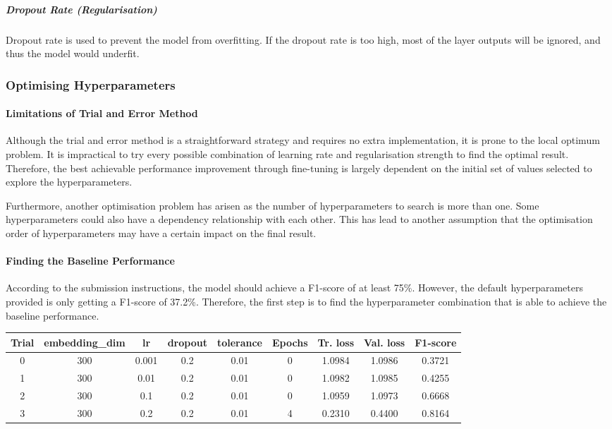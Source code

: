\documentclass[11pt]{article}
\begin{document}
\hypertarget{dropout-rate-regularisation}{%
\subparagraph{Dropout Rate
(Regularisation)}\label{dropout-rate-regularisation}}

Dropout rate is used to prevent the model from overfitting. If the
dropout rate is too high, most of the layer outputs will be ignored, and
thus the model would underfit.

\hypertarget{optimising-hyperparameters}{%
\subsubsection{Optimising
Hyperparameters}\label{optimising-hyperparameters}}

\hypertarget{limitations-of-trial-and-error-method}{%
\paragraph{Limitations of Trial and Error
Method}\label{limitations-of-trial-and-error-method}}

Although the trial and error method is a straightforward strategy and
requires no extra implementation, it is prone to the local optimum
problem. It is impractical to try every possible combination of learning
rate and regularisation strength to find the optimal result. Therefore,
the best achievable performance improvement through fine-tuning is
largely dependent on the initial set of values selected to explore the
hyperparameters.

Furthermore, another optimisation problem has arisen as the number of
hyperparameters to search is more than one. Some hyperparameters could
also have a dependency relationship with each other. This has lead to
another assumption that the optimisation order of hyperparameters may
have a certain impact on the final result.

\hypertarget{finding-the-baseline-performance}{%
\paragraph{Finding the Baseline
Performance}\label{finding-the-baseline-performance}}

According to the submission instructions, the model should achieve a
F1-score of at least 75\%. However, the default hyperparameters provided
is only getting a F1-score of 37.2\%. Therefore, the first step is to
find the hyperparameter combination that is able to achieve the baseline
performance.

\begin{longtable}[]{@{}ccccccccc@{}}
\toprule
Trial & embedding\_dim & lr & dropout & tolerance & Epochs & Tr. loss &
Val. loss & F1-score\tabularnewline
\midrule
\endhead
0 & 300 & 0.001 & 0.2 & 0.01 & 0 & 1.0984 & 1.0986 &
0.3721\tabularnewline
1 & 300 & 0.01 & 0.2 & 0.01 & 0 & 1.0982 & 1.0985 &
0.4255\tabularnewline
2 & 300 & 0.1 & 0.2 & 0.01 & 0 & 1.0959 & 1.0973 & 0.6668\tabularnewline
3 & 300 & 0.2 & 0.2 & 0.01 & 4 & 0.2310 & 0.4400 & 0.8164\tabularnewline
\bottomrule
\end{longtable}
\end{document}
